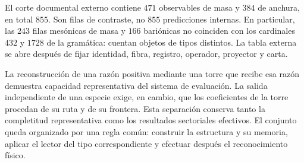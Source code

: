 El corte documental externo contiene \(471\) observables de masa y
\(384\) de anchura, en total \(855\). Son filas de contraste, no
\(855\) predicciones internas. En particular, las \(243\) filas
mesónicas de masa y \(166\) bariónicas no coinciden con los cardinales
\(432\) y \(1728\) de la gramática: cuentan objetos de tipos distintos.
La tabla externa se abre después de fijar identidad, fibra, registro,
operador, proyector y carta.

La reconstrucción de una razón positiva mediante una torre que recibe
esa razón demuestra capacidad representativa del sistema de evaluación.
La salida independiente de una especie exige, en cambio, que los
coeficientes de la torre procedan de su ruta y de su frontera. Esta
separación conserva tanto la completitud representativa como los
resultados sectoriales efectivos. El conjunto queda organizado por una
regla común: construir la estructura y su memoria, aplicar el lector
del tipo correspondiente y efectuar después el reconocimiento físico.
